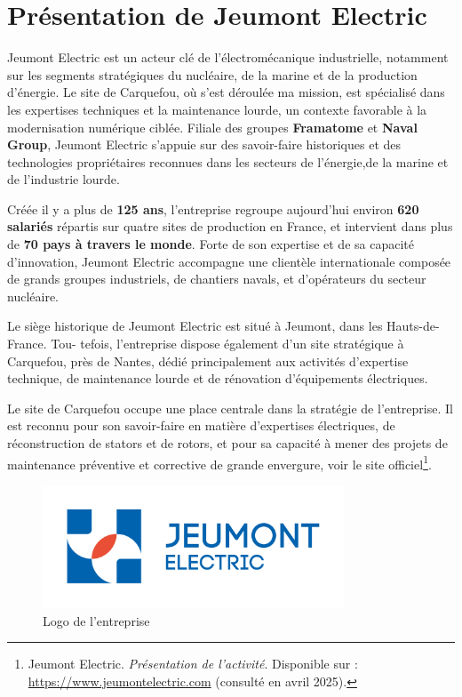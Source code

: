 \documentclass[11pt,a4paper]{article}
\begin{document}
\newpage
\section{Présentation de Jeumont Electric}

Jeumont Electric est un acteur clé de l’électromécanique industrielle, notamment sur les segments stratégiques du nucléaire, de la marine et de la production d’énergie. Le site de Carquefou, où s’est déroulée ma mission, est spécialisé dans les expertises techniques et la maintenance lourde, un contexte favorable à la modernisation numérique ciblée. Filiale des groupes \textbf{Framatome} et \textbf{Naval Group}, Jeumont Electric s'appuie sur des savoir-faire historiques et des technologies propriétaires reconnues dans les secteurs de l'énergie,de la marine et de l'industrie lourde.

Créée il y a plus de \textbf{125 ans}, l'entreprise regroupe aujourd'hui environ \textbf{620 salariés} répartis sur quatre sites de production en France, et intervient dans plus de\textbf{ 70 pays à travers le monde}. Forte de son expertise et de sa capacité d'innovation, Jeumont Electric accompagne une clientèle internationale composée de grands groupes industriels, de chantiers navals, et d'opérateurs du secteur nucléaire.

Le siège historique de Jeumont Electric est situé à Jeumont, dans les Hauts-de-France. Tou-
tefois, l'entreprise dispose également d'un site stratégique à Carquefou, près de Nantes, dédié principalement aux activités d'expertise technique, de maintenance lourde et de rénovation
d'équipements électriques.

Le site de Carquefou occupe une place centrale dans la stratégie de l'entreprise. Il est reconnu
pour son savoir-faire en matière d'expertises électriques, de réconstruction de stators et de rotors, et
pour sa capacité à mener des projets de maintenance préventive et corrective de grande envergure, voir le site officiel\footnote{Jeumont Electric. \textit{Présentation de l’activité}. Disponible sur : \url{https://www.jeumontelectric.com} (consulté en avril 2025).}.

\begin{figure}[H]
    \centering
    \includegraphics[width=0.8\textwidth]{../Images/logo.png}
    \caption{Logo de l'entreprise}
\end{figure}
\end{document}
